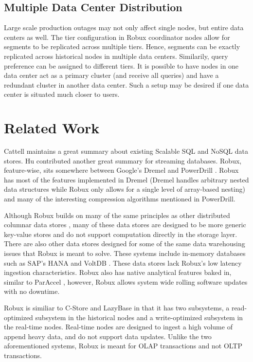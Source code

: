 \documentclass{sig-alternate-2013}
\begin{document}
\subsection{Multiple Data Center Distribution}
Large scale production outages may not only affect single nodes, but entire
data centers as well. The tier configuration in Robux coordinator nodes allow
for segments to be replicated across multiple tiers. Hence, segments can be
exactly replicated across historical nodes in multiple data centers.
Similarily, query preference can be assigned to different tiers. It is possible
to have nodes in one data center act as a primary cluster (and receive all
queries) and have a redundant cluster in another data center. Such a setup may
be desired if one data center is situated much closer to users.

\section{Related Work}
\label{sec:related}
Cattell \cite{cattell2011scalable} maintains a great summary about existing
Scalable SQL and NoSQL data stores. Hu \cite{hu2011stream} contributed another
great summary for streaming databases. Robux, feature-wise, sits somewhere
between Google’s Dremel \cite{melnik2010dremel} and PowerDrill
\cite{hall2012processing}. Robux has most of the features implemented in Dremel
(Dremel handles arbitrary nested data structures while Robux only allows for a
single level of array-based nesting) and many of the interesting compression
algorithms mentioned in PowerDrill.

Although Robux builds on many of the same principles as other distributed
columnar data stores \cite{fink2012distributed}, many of these data stores are
designed to be more generic key-value stores \cite{lakshman2010cassandra} and do not
support computation directly in the storage layer. There are also other data
stores designed for some of the same data warehousing issues that Robux
is meant to solve. These systems include in-memory databases such as
SAP’s HANA \cite{farber2012sap} and VoltDB \cite{voltdb2010voltdb}. These data
stores lack Robux's low latency ingestion characteristics. Robux also has
native analytical features baked in, similar to ParAccel \cite{paraccel2013}, however,
Robux allows system wide rolling software updates with no downtime.

Robux is similiar to C-Store \cite{stonebraker2005c} and LazyBase \cite{cipar2012lazybase} in that it has
two subsystems, a read-optimized subsystem in the historical nodes and a
write-optimized subsystem in the real-time nodes. Real-time nodes are designed to
ingest a high volume of append heavy data, and do not support data updates.
Unlike the two aforementioned systems, Robux is meant for OLAP transactions and
not OLTP transactions.
\end{document}
